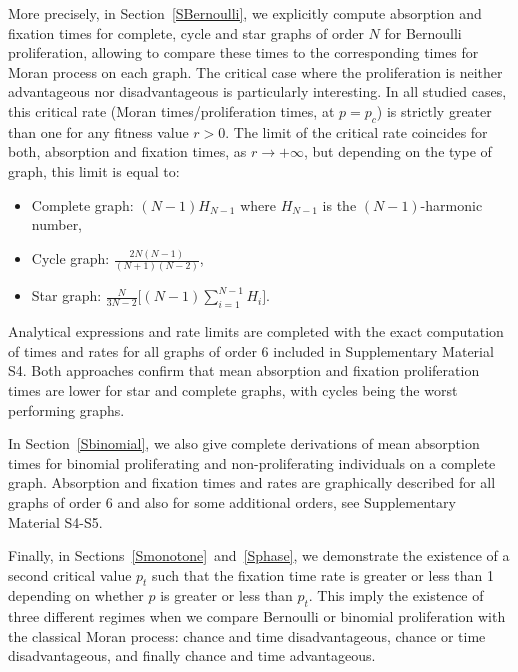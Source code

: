 \documentclass[a4paper,english,10pt]{amsart}
\theoremstyle{definition}
\numberwithin{equation}{section}
\begin{document}
More precisely, in Section~\ref{SBernoulli},
we explicitly compute absorption and fixation times for complete, cycle and star graphs of order $N$ for Bernoulli proliferation, allowing to compare these times to the corresponding times for Moran process on each graph. The critical case where the proliferation is neither advantageous nor disadvantageous is particularly interesting. In all studied cases, this critical rate (Moran times/proliferation times, at $p=p_c$) is strictly greater than one for any fitness value $r > 0$. The limit of the critical rate coincides for both, absorption and fixation times, as $r \to +\infty$, but depending on the type of graph, this limit is equal to:
\begin{itemize}
\item Complete graph: $(N-1)H_{N-1}$ where $H_{N-1}$ is the $(N-1)$-harmonic number, 

\item Cycle graph: $\frac{\textstyle 2N(N-1)}{\textstyle(N+1)(N-2)}$,

\item Star graph: 
$\frac{\textstyle N}{\textstyle 3N-2} 
\big[ (N-1) \sum_{i=1}^{N-1} H_ i \big].$
\end{itemize}
Analytical expressions and rate limits are completed with the exact computation of times and rates for all graphs of order $6$ included in Supplementary Material S4. Both approaches confirm that mean absorption and fixation proliferation times are lower for star and complete graphs, with cycles being the worst performing graphs.

In Section~\ref{Sbinomial}, we also give complete derivations of mean absorption times for binomial proliferating and non-proliferating individuals on a complete graph. Absorption and fixation times and rates are graphically described for all graphs of order $6$ and also for some additional orders, see Supplementary Material S4-S5.


 Finally, in Sections~\ref{Smonotone}~and~\ref{Sphase}, we demonstrate the existence of a second critical value $p_t$ such that the fixation time rate is greater or less than 1 depending on whether $p$ is greater or less than $p_t$. This imply the existence of three different regimes when we compare Bernoulli or binomial proliferation with the classical Moran process: chance and time disadvantageous, chance or time disadvantageous, and finally chance and time advantageous. 
\end{document}
